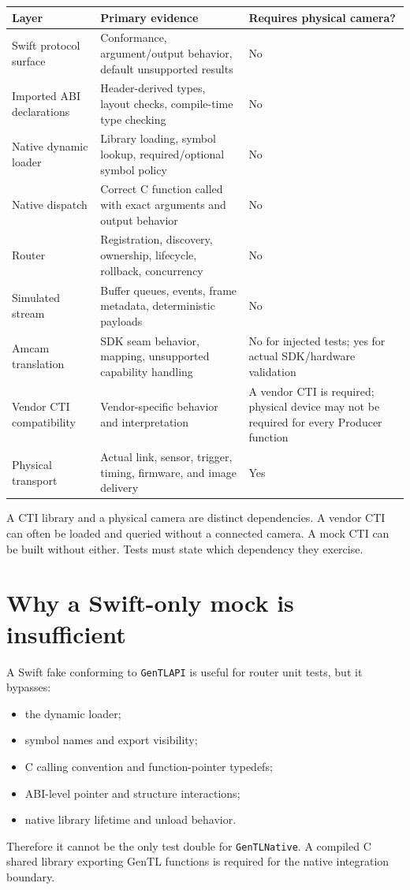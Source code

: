 \documentclass[11pt,a4paper]{report}
\begin{document}
\begin{longtable}{p{}p{}p{}}
\toprule
Layer & Primary evidence & Requires physical camera? \\
\midrule
Swift protocol surface & Conformance, argument/output behavior, default unsupported results & No \\
Imported ABI declarations & Header-derived types, layout checks, compile-time type checking & No \\
Native dynamic loader & Library loading, symbol lookup, required/optional symbol policy & No \\
Native dispatch & Correct C function called with exact arguments and output behavior & No \\
Router & Registration, discovery, ownership, lifecycle, rollback, concurrency & No \\
Simulated stream & Buffer queues, events, frame metadata, deterministic payloads & No \\
Amcam translation & SDK seam behavior, mapping, unsupported capability handling & No for injected tests; yes for actual SDK/hardware validation \\
Vendor CTI compatibility & Vendor-specific behavior and interpretation & A vendor CTI is required; physical device may not be required for every Producer function \\
Physical transport & Actual link, sensor, trigger, timing, firmware, and image delivery & Yes \\
\bottomrule
\end{longtable}

A CTI library and a physical camera are distinct dependencies. A vendor CTI can often be loaded and queried without a connected camera. A mock CTI can be built without either. Tests must state which dependency they exercise.

\section{Why a Swift-only mock is insufficient}
A Swift fake conforming to \texttt{GenTLAPI} is useful for router unit tests, but it bypasses:
\begin{itemize}
  \item the dynamic loader;
  \item symbol names and export visibility;
  \item C calling convention and function-pointer typedefs;
  \item ABI-level pointer and structure interactions;
  \item native library lifetime and unload behavior.
\end{itemize}
Therefore it cannot be the only test double for \texttt{GenTLNative}. A compiled C shared library exporting GenTL functions is required for the native integration boundary.
\end{document}
